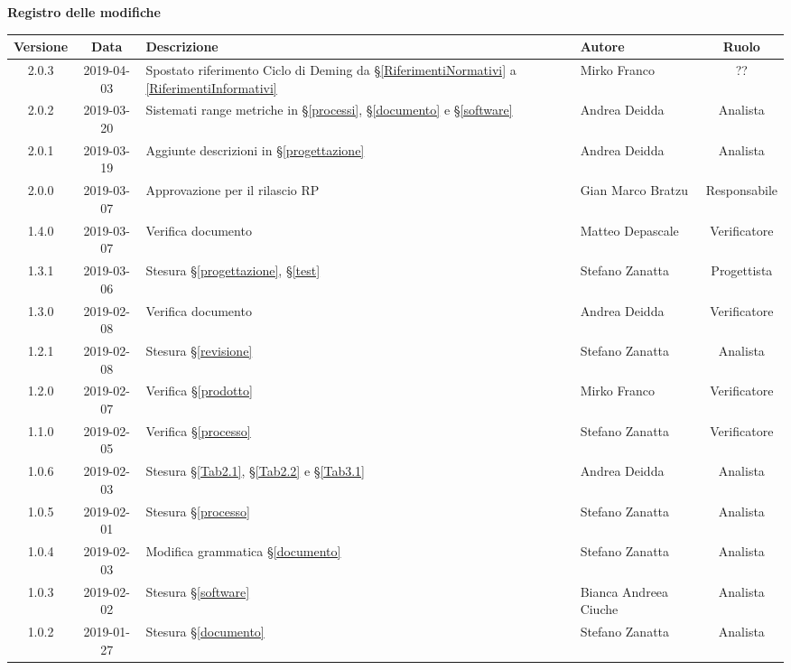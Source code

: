 	\begin{center}
		\textbf{Registro delle modifiche}
	\end{center}
	\begin{center}
		\begin{tabularx}{\textwidth}{|c|c|X|X|c|}
			\hline
			\textbf{Versione} & \textbf{Data} & \textbf{Descrizione} & \textbf{Autore} & \textbf{Ruolo} \\
			\hline
			2.0.3 & 2019-04-03 & Spostato riferimento Ciclo di Deming da \S\ref{RiferimentiNormativi} a \ref{RiferimentiInformativi} & Mirko Franco & ?? \\
			\hline
			2.0.2 & 2019-03-20 &  Sistemati range metriche in \S\ref{processi}, \S\ref{documento} e \S\ref{software} & Andrea Deidda & Analista \\
			\hline
			2.0.1 & 2019-03-19 &  Aggiunte descrizioni in \S\ref{progettazione} & Andrea Deidda & Analista \\
			\hline
			2.0.0 & 2019-03-07 &  Approvazione per il rilascio RP & Gian Marco Bratzu & Responsabile \\
			\hline
			1.4.0 & 2019-03-07 &  Verifica documento & Matteo Depascale & Verificatore \\
			\hline
			1.3.1 & 2019-03-06 &  Stesura \S\ref{progettazione}, \S\ref{test} & Stefano Zanatta & Progettista \\
			\hline
			1.3.0 & 2019-02-08 &  Verifica documento & Andrea Deidda & Verificatore \\
			\hline
			1.2.1 & 2019-02-08 &  Stesura \S\ref{revisione} & Stefano Zanatta & Analista \\
			\hline
			1.2.0 & 2019-02-07 & Verifica \S\ref{prodotto} & Mirko Franco & Verificatore \\
			\hline
			1.1.0 & 2019-02-05 & Verifica \S\ref{processo}& Stefano Zanatta & Verificatore\\
			\hline
			1.0.6 & 2019-02-03 & Stesura \S\ref{Tab2.1}, \S\ref{Tab2.2} e \S\ref{Tab3.1} & Andrea Deidda & Analista\\
			\hline
			1.0.5 & 2019-02-01 & Stesura \S\ref{processo}& Stefano Zanatta & Analista\\
			\hline
			1.0.4 & 2019-02-03 & Modifica grammatica \S\ref{documento}& Stefano Zanatta & Analista\\
			\hline
			1.0.3 & 2019-02-02 & Stesura \S\ref{software}& Bianca Andreea Ciuche & Analista\\
			\hline
			1.0.2 & 2019-01-27 & Stesura \S\ref{documento}& Stefano Zanatta & Analista\\

\end{tabularx}
\end{center}
